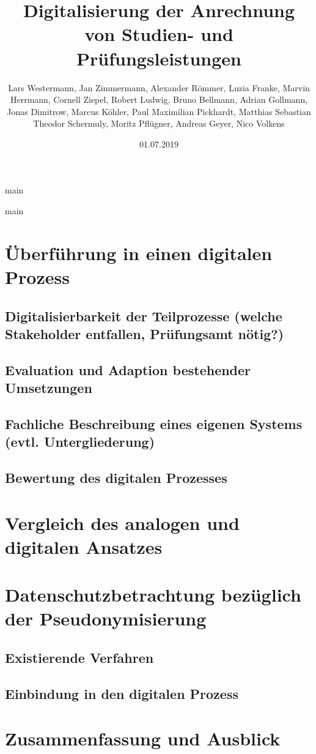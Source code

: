 \documentclass[ngerman]{tudscrreprt}
\begin{document}
\date{01.07.2019}
\author{Lars Westermann, Jan Zimmermann, Alexander Römmer, Luzia Franke, Marvin Herrmann, Cornell Ziepel, Robert Ludwig, Bruno Bellmann, Adrian Gollmann, Jonas Dimitrow, Marcus Köhler, Paul Maximilian Pickhardt, Matthias Sebastian Theodor Schermuly, Moritz Pflügner, Andreas Geyer, Nico Volkens}
\title{Digitalisierung der Anrechnung von Studien- und Prüfungsleistungen}
\maketitle

\tableofcontents

{main}

{main}


\chapter{Überführung in einen digitalen Prozess}

\section{Digitalisierbarkeit der Teilprozesse (welche Stakeholder entfallen, Prüfungsamt nötig?)}

\section{Evaluation und Adaption bestehender Umsetzungen}

\section{Fachliche Beschreibung eines eigenen Systems (evtl. Untergliederung)}

\section{Bewertung des digitalen Prozesses}

\chapter{Vergleich des analogen und digitalen Ansatzes}

\chapter{Datenschutzbetrachtung bezüglich der Pseudonymisierung}

\section{Existierende Verfahren}

\section{Einbindung in den digitalen Prozess}

\chapter{Zusammenfassung und Ausblick}
\end{document}

